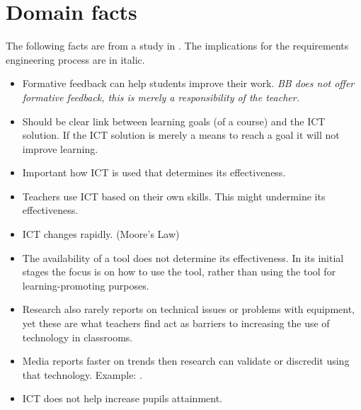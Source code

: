\section{Domain facts}
The following facts are from a study in \cite{ict_study}. The implications for the requirements engineering process are in italic.
\begin{itemize}                                                           
	\item Formative feedback can help students improve their work. \textit{BB does not offer formative feedback, this is merely a responsibility of the teacher.}
	\item Should be clear link between learning goals (of a course) and the ICT solution. If the ICT solution is merely a means to reach a goal it will not improve learning. 
	\item Important how ICT is used that determines its effectiveness. 
	\item Teachers use ICT based on their own skills. This might undermine its effectiveness. 
	\item ICT changes rapidly. (Moore's Law)
	\item The availability of a tool does not determine its effectiveness. In its initial stages the focus is on how to use the tool, rather than using the tool for learning-promoting purposes.
	\item Research also rarely reports on technical issues or problems with equipment, yet these are what teachers find act as barriers to increasing the use of technology in classrooms. 
	\item Media reports faster on trends then research can validate or discredit using that technology. Example: . 
	\item ICT does not help increase pupils attainment.
\end{itemize}

